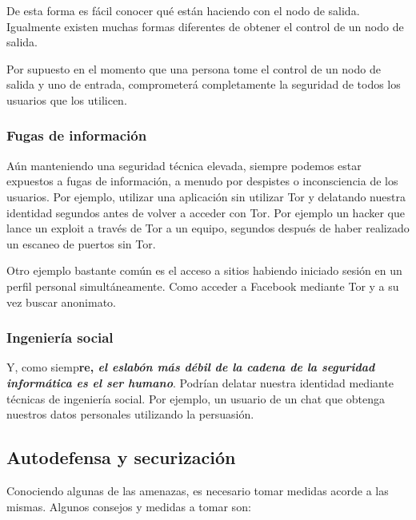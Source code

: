 \documentclass[a4paper, 11pt, titlepage]{article}
\begin{document}
            De esta forma es fácil conocer qué están haciendo con el nodo de salida. Igualmente existen muchas formas 
            diferentes de obtener el control de un nodo de salida.

            Por supuesto en el momento que una persona tome el control de un nodo de salida y uno de entrada, comprometerá 
            completamente la seguridad de todos los usuarios que los utilicen.

        \subsubsection{Fugas de información}
        
            Aún manteniendo una seguridad técnica elevada, siempre podemos estar expuestos a fugas de información, a 
            menudo por despistes o inconsciencia de los usuarios. Por ejemplo, utilizar una aplicación sin utilizar Tor 
            y delatando nuestra identidad segundos antes de volver a acceder con Tor. Por ejemplo un hacker que lance un 
            exploit a través de Tor a un equipo, segundos después de haber realizado un escaneo de puertos sin Tor.

            Otro ejemplo bastante común es el acceso a sitios habiendo iniciado sesión en un perfil personal simultáneamente.
            Como acceder a Facebook mediante Tor y a su vez buscar anonimato.

        \subsubsection{Ingeniería social}
       
            Y, como siemp\textbf{re, \emph{el eslabón más débil de la cadena de la seguridad informática es el ser humano}}. 
            Podrían delatar nuestra identidad mediante técnicas de ingeniería social. Por ejemplo, un usuario de un chat que 
            obtenga nuestros datos personales utilizando la persuasión. 

        \subsection{Autodefensa y securización}

            Conociendo algunas de las amenazas, es necesario tomar medidas acorde a las mismas. Algunos consejos y medidas 
            a tomar son:
\end{document}
